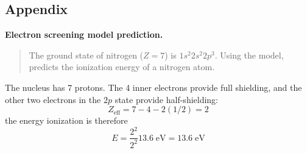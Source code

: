 \documentclass[../main.tex]{subfiles}
\begin{document}
\subsection*{Appendix}
\textbf{Electron screening model prediction.} 
\begin{quote}
    The ground state of nitrogen ($Z = 7$) is $1s^2 2s^2 2p^3$. Using the model, predicts the ionization energy of a nitrogen atom.
\end{quote}
The nucleus has 7 protons. The 4 inner electrons provide full shielding, and the other two electrons in the $2p$ state provide half-shielding:
\begin{equation*}
    Z_{\text{eff}}=7-4-2(1/2)=2
\end{equation*}
the energy ionization is therefore
\begin{equation*}
    E=\frac{2^2}{2^2}13.6\;\text{eV}=13.6\;\text{eV}
\end{equation*}
\end{document}
